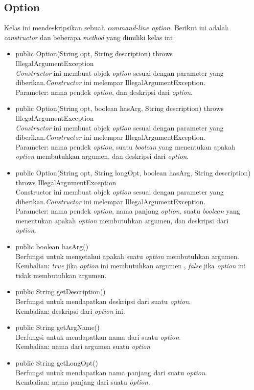 \subsection{Option}
\label{subsec:option}
Kelas ini mendeskripsikan sebuah \textit{command-line option}. Berikut ini adalah \textit{constructor} dan beberapa \textit{method} yang dimiliki kelas ini: 
\begin{itemize}
\item public Option(String opt, String description) throws IllegalArgumentException\\
\textit{Constructor} ini membuat objek \textit{option} sesuai dengan parameter yang diberikan.\textit{Constructor} ini melempar IllegalArgumentException.\\
Parameter: nama pendek \textit{option}, dan deskripsi dari \textit{option}.
\item public Option(String opt, boolean hasArg, String description) throws IllegalArgumentException\\
\textit{Constructor} ini membuat objek \textit{option} sesuai dengan parameter yang diberikan.\textit{Constructor} ini melempar IllegalArgumentException.\\
Parameter: nama pendek \textit{option}, suatu \textit{boolean} yang menentukan apakah \textit{option} membutuhkan argumen, dan deskripsi dari \textit{option}.
\item public Option(String opt, String longOpt, boolean hasArg, String description) throws IllegalArgumentException\\
{Constructor} ini membuat objek \textit{option} sesuai dengan parameter yang diberikan.\textit{Constructor} ini melempar IllegalArgumentException.\\
Parameter: nama pendek \textit{option}, nama panjang \textit{option}, suatu \textit{boolean} yang menentukan apakah \textit{option} membutuhkan argumen, dan deskripsi dari \textit{option}.
\item public boolean hasArg()\\
Berfungsi untuk mengetahui apakah suatu \textit{option} membutuhkan argumen.\\
Kembalian: \textit{true} jika \textit{option} ini membutuhkan argumen , \textit{false} jika \textit{option} ini tidak membutuhkan argumen.
\item public String getDescription()\\
Berfungsi untuk mendapatkan deskripsi dari suatu \textit{option}.\\
Kembalian: deskripsi dari \textit{option} ini.
\item public String getArgName()\\
Berfungsi untuk mendapatkan nama dari suatu \textit{option}.\\
Kembalian: nama dari argumen suatu \textit{option}
\item public String getLongOpt()\\
Berfungsi untuk mendapatkan nama panjang dari suatu \textit{option}.\\
Kembalian: nama panjang dari suatu \textit{option}.

\end{itemize}

